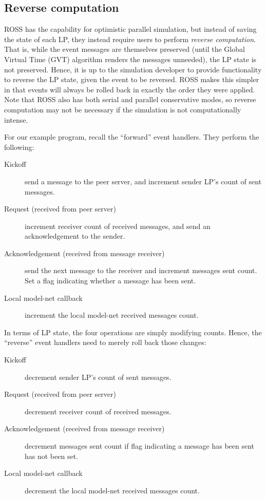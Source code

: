 \documentclass[conference,10pt,compsocconf,onecolumn]{IEEEtran}
\begin{document}
\subsection{Reverse computation}

ROSS has the capability for optimistic parallel simulation, but instead of
saving the state of each LP, they instead require users to perform \emph{reverse
computation}. That is, while the event messages are themselves preserved (until
the Global Virtual Time (GVT) algorithm renders the messages unneeded), the LP
state is not preserved. Hence, it is up to the simulation developer to provide
functionality to reverse the LP state, given the event to be reversed. ROSS
makes this simpler in that events will always be rolled back in exactly the
order they were applied. Note that ROSS also has both serial and parallel
conservative modes, so reverse computation may not be necessary if the
simulation is not computationally intense.

For our example program, recall the ``forward'' event handlers. They perform the
following: 
\begin{description}
    \item [Kickoff] send a message to the peer server, and increment sender LP's
        count of sent messages.
    \item [Request (received from peer server)] increment receiver count of
        received messages, and send an acknowledgement to the sender.
    \item [Acknowledgement (received from message receiver)] send the next
        message to the receiver and increment messages sent count. Set a flag
        indicating whether a message has been sent.  
    \item [Local model-net callback] increment the local model-net
        received messages count.
\end{description}

In terms of LP state, the four operations are simply modifying counts. Hence,
the ``reverse'' event handlers need to merely roll back those changes: 
\begin{description}
    \item [Kickoff] decrement sender LP's count of sent messages.
    \item [Request (received from peer server)] decrement receiver count of
        received messages.
    \item [Acknowledgement (received from message receiver)] decrement messages
        sent count if flag indicating a message has been sent has not been
        set.
    \item [Local model-net callback] decrement the local model-net
        received messages count.
\end{description}
\end{document}

